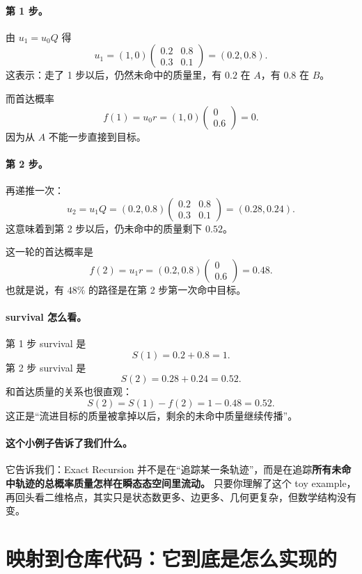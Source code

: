 \documentclass[11pt,fontset=fandol]{ctexart}
\begin{document}
\paragraph{第 1 步。}
由 $u_1=u_0Q$ 得
\[
  u_1=(1,0)
  \begin{pmatrix}
    0.2 & 0.8\\
    0.3 & 0.1
  \end{pmatrix}
  =(0.2,0.8).
\]
这表示：走了 1 步以后，仍然未命中的质量里，有 $0.2$ 在 $A$，有 $0.8$ 在 $B$。

而首达概率
\[
  f(1)=u_0r=(1,0)
  \begin{pmatrix}
    0\\
    0.6
  \end{pmatrix}
  =0.
\]
因为从 $A$ 不能一步直接到目标。

\paragraph{第 2 步。}
再递推一次：
\[
  u_2=u_1Q=(0.2,0.8)
  \begin{pmatrix}
    0.2 & 0.8\\
    0.3 & 0.1
  \end{pmatrix}
  =(0.28,0.24).
\]
这意味着到第 2 步以后，仍未命中的质量剩下 $0.52$。

这一轮的首达概率是
\[
  f(2)=u_1r=(0.2,0.8)
  \begin{pmatrix}
    0\\
    0.6
  \end{pmatrix}
  =0.48.
\]
也就是说，有 $48\%$ 的路径是在第 2 步第一次命中目标。

\paragraph{survival 怎么看。}
第 1 步 survival 是
\[
  S(1)=0.2+0.8=1.
\]
第 2 步 survival 是
\[
  S(2)=0.28+0.24=0.52.
\]
和首达质量的关系也很直观：
\[
  S(2)=S(1)-f(2)=1-0.48=0.52.
\]
这正是“流进目标的质量被拿掉以后，剩余的未命中质量继续传播”。

\paragraph{这个小例子告诉了我们什么。}
它告诉我们：Exact Recursion 并不是在“追踪某一条轨迹”，而是在追踪\textbf{所有未命中轨迹的总概率质量怎样在瞬态态空间里流动。} 只要你理解了这个 toy example，再回头看二维格点，其实只是状态数更多、边更多、几何更复杂，但数学结构没有变。

\section{映射到仓库代码：它到底是怎么实现的}
\end{document}
